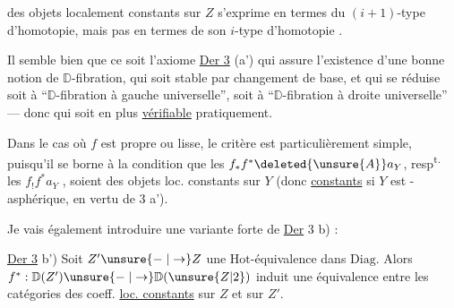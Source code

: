 
des objets localement constants sur $Z$ s'exprime en termes du $(i+1)$-type d'homotopie, mais pas en termes de son $i$-type d'homotopie .

Il semble bien que ce soit l'axiome \uline{Der 3} (a') qui assure l'existence d'une bonne notion  de $\mathbb D$-fibration, qui soit stable par changement de base, et qui se réduise soit à ``$\mathbb D$-fibration à gauche universelle'', soit à ``$\mathbb D$-fibration à droite universelle'' --- donc qui soit en plus  \uline{vérifiable} pratiquement.

Dans le cas où $f$ est propre ou lisse, le critère est particulièrement simple, puisqu'il se borne à la condition que  les $f_*f^*\deleted{\unsure{A}}a_Y$, resp\textsuperscript{t.} les $f_!f^*a_Y$ , soient des objets loc. constants sur $Y$ (donc \uline{constants} si $Y$ est -asphérique, en vertu de  3 a').

Je vais également introduire une variante  forte de \uline{Der} 3 b) :


\uline{Der 3} b') Soit $Z'\unsure{\relbar|\to}Z$ une $\mathrm{Hot}$-équivalence dans $\mathrm{Diag}$. Alors $f^*:\mathbb D(Z')\unsure{\relbar|\to}\mathbb D(\unsure{Z|2})$ induit une équivalence entre les catégories des coeff. \uline{loc. constants} sur $Z$ et sur $Z'$.

